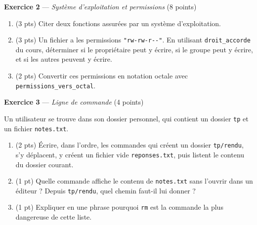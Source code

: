 \bigskip

\textbf{Exercice 2} --- \textit{Système d'exploitation et permissions} \hfill (8 points)

\begin{enumerate}
  \item (3 pts) Citer deux fonctions assurées par un système d'exploitation.
  \item (3 pts) Un fichier a les permissions \lstinline{"rw-rw-r--"}. En utilisant \lstinline{droit_accorde} du cours, déterminer si le propriétaire peut y écrire, si le groupe peut y écrire, et si les autres peuvent y écrire.
  \item (2 pts) Convertir ces permissions en notation octale avec \lstinline{permissions_vers_octal}.
\end{enumerate}


\bigskip

\textbf{Exercice 3} --- \textit{Ligne de commande} \hfill (4 points)

Un utilisateur se trouve dans son dossier personnel, qui contient un dossier \lstinline{tp}
et un fichier \lstinline{notes.txt}.

\begin{enumerate}
  \item (2 pts) Écrire, dans l'ordre, les commandes qui créent un dossier \lstinline{tp/rendu},
  s'y déplacent, y créent un fichier vide \lstinline{reponses.txt}, puis listent le contenu
  du dossier courant.
  \item (1 pt) Quelle commande affiche le contenu de \lstinline{notes.txt} sans l'ouvrir dans
  un éditeur ? Depuis \lstinline{tp/rendu}, quel chemin faut-il lui donner ?
  \item (1 pt) Expliquer en une phrase pourquoi \lstinline{rm} est la commande la plus
  dangereuse de cette liste.
\end{enumerate}

